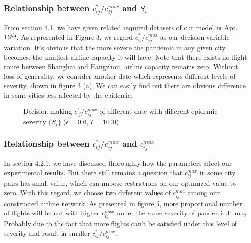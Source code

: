 \documentclass[11pt,twocolumn]{article}
\begin{document}
\subsubsection{Relationship between $c_{ij}^* / c_{ij}^{max}$ and $S_i$}
From section 4.1, we have given related required datasets of our model in Apr.$16^{\rm th}$. As represented in Figure 3, we regard $c_{ij}^* / c_{ij}^{max}$ as our decision variable variation. It's obvious that the more severe the pandemic in any given city becomes, the smallest airline capacity it will have. Note that there exists no flight route between Shanghai and Hangzhou, airline capacity remains zero. Without loss of generality, we consider another date which represents different levels of severity, shown in figure 3 (a). We can easily find out there are 
obvious difference in some cities less affected by the epidemic.

\begin{figure}[H]
    \centering
    \caption{Decision making $c_{ij}^* / c_{ij}^{max}$ of different date with different epidemic severity $\{S_i\}$ ($\epsilon=0.6,T=1000$)}
    \label{fig:my_label}
\end{figure}



\subsubsection{Relationship between $c_{ij}^* / c_{ij}^{max}$ and $c_{ij}^{max}$}
In section 4.2.1, we have discussed thoroughly how the parameters affect our experimental results. But there still remains a question that $c_{ij}^{max}$ in some city pairs has small value, which can impose restrictions on our optimized value to zero. With this regard, we choose two different values of $c_{ij}^{max}$ among our constructed airline network. As presented in figure 5, more proportional number of flights will be cut with higher $c_{ij}^{max}$ under the same severity of pandemic.It may Probably due to the fact that more flights can't be satisfied under this level of severity and result in smaller $c_{ij}^* / c_{ij}^{max}$.
\end{document}

